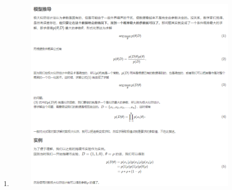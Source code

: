 \documentclass[12pt]{ctexart}%
\begin{document}
\begin{enumerate}
			\item[] 
				\begin{figure}[H]
					\vspace{-0.2cm}  %
					\centering
					\includegraphics[scale=0.8]{derivation_MLE.png}
					\renewcommand{\figurename}{Fig} %
				\end{figure}
			

\end{enumerate}
\end{document}
